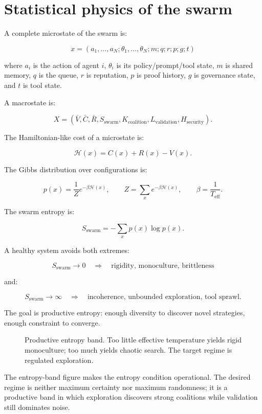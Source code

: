 \documentclass[
  11pt,
]{article}
\begin{document}
\section{Statistical physics of the
swarm}\label{statistical-physics-of-the-swarm}

A complete microstate of the swarm is:

\[
x=(a_1,\ldots,a_N;\theta_1,\ldots,\theta_N;m;q;r;p;g;t)
\]

where \(a_i\) is the action of agent \(i\), \(\theta_i\) is its
policy/prompt/tool state, \(m\) is shared memory, \(q\) is the queue,
\(r\) is reputation, \(p\) is proof history, \(g\) is governance state,
and \(t\) is tool state.

A macrostate is:

\[
X=(\bar{V},\bar{C},\bar{R},S_{\text{swarm}},K_{\text{coalition}},L_{\text{validation}},H_{\text{security}}).
\]

The Hamiltonian-like cost of a microstate is:

\[
\mathcal{H}(x)=C(x)+R(x)-V(x).
\]

The Gibbs distribution over configurations is:

\[
p(x)=\frac{1}{Z}e^{-\beta\mathcal{H}(x)},
\qquad
Z=\sum_x e^{-\beta\mathcal{H}(x)},
\qquad
\beta=\frac{1}{T_{\text{eff}}}.
\]

The swarm entropy is:

\[
S_{\text{swarm}}=-\sum_xp(x)\log p(x).
\]

A healthy system avoids both extremes:

\[
S_{\text{swarm}}\rightarrow 0
\quad\Rightarrow\quad
\text{rigidity, monoculture, brittleness}
\]

and:

\[
S_{\text{swarm}}\rightarrow \infty
\quad\Rightarrow\quad
\text{incoherence, unbounded exploration, tool sprawl}.
\]

The goal is productive entropy: enough diversity to discover novel
strategies, enough constraint to converge.

\begin{figure}
\centering
\resizebox{0.88\textwidth}{!}{}
\caption{Productive entropy band. Too little effective temperature
yields rigid monoculture; too much yields chaotic search. The target
regime is regulated exploration.}
\end{figure}

The entropy-band figure makes the entropy condition operational. The desired regime is
neither maximum certainty nor maximum randomness; it is a productive
band in which exploration discovers strong coalitions while validation
still dominates noise.
\end{document}

